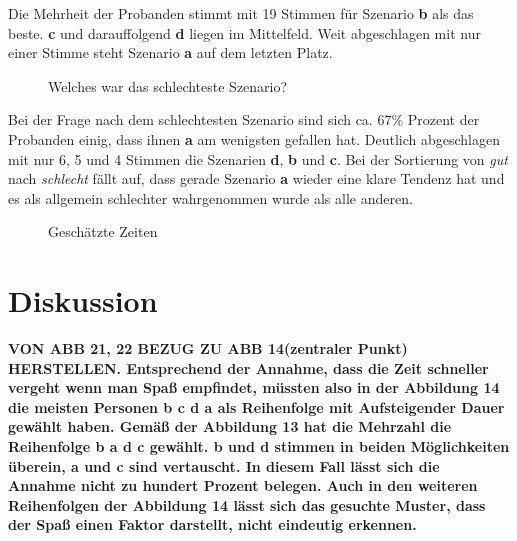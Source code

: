 \documentclass{Paper}
\begin{document}
Die Mehrheit der Probanden stimmt mit 19 Stimmen für Szenario \textbf{b} als das beste. \textbf{c} und darauffolgend \textbf{d} liegen im Mittelfeld. Weit abgeschlagen mit nur einer Stimme steht Szenario \textbf{a} auf dem letzten Platz.
	
	
	\begin{figure}[ht]
\caption{Welches war das schlechteste Szenario?}
\label{SzenarioSchlecht}
\end{figure}
	

Bei der Frage nach dem schlechtesten Szenario sind sich ca. 67\% Prozent der Probanden einig, dass ihnen \textbf{a} am wenigsten gefallen hat. Deutlich abgeschlagen mit nur 6, 5 und 4 Stimmen die Szenarien \textbf{d}, \textbf{b} und \textbf{c}. 
Bei der Sortierung von \textit{gut} nach \textit{schlecht} fällt auf, dass gerade Szenario \textbf{a} wieder eine klare Tendenz hat und es als allgemein schlechter wahrgenommen wurde als alle anderen.


\begin{figure}
\label{time}
\caption{Geschätzte Zeiten}
\label{ZeitGeschaetzt}
\end{figure}


\section{Diskussion}
\textbf{VON ABB 21, 22 BEZUG ZU ABB 14(zentraler Punkt) HERSTELLEN. Entsprechend der Annahme, dass die Zeit schneller vergeht wenn man Spaß empfindet, müssten also in der Abbildung 14 die meisten Personen \textbf{b c d a} als Reihenfolge mit Aufsteigender Dauer gewählt haben. Gemäß der Abbildung 13 hat die Mehrzahl die Reihenfolge \textbf{b a d c} gewählt. \textbf{b} und \textbf{d} stimmen in beiden Möglichkeiten überein, \textbf{a} und \textbf{c} sind vertauscht. In diesem Fall lässt sich die Annahme nicht zu hundert Prozent belegen. Auch in den weiteren Reihenfolgen der Abbildung 14 lässt sich das gesuchte Muster, dass der Spaß einen Faktor darstellt, nicht eindeutig erkennen.}
\end{document}
